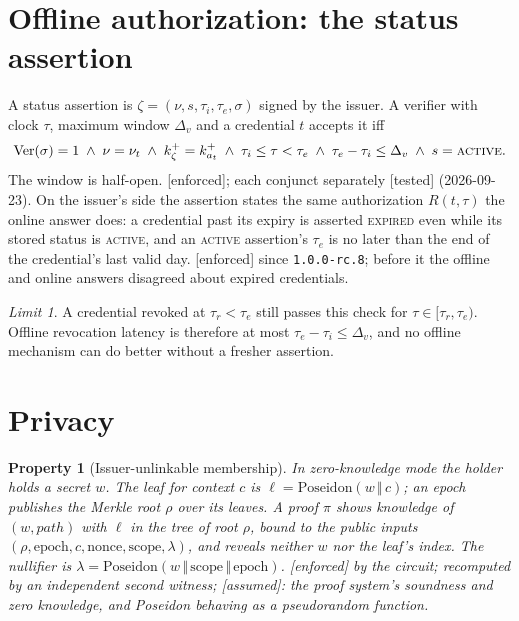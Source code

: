 \documentclass[11pt]{article}
\newtheorem{property}{Property}
\theoremstyle{remark}
\newtheorem*{limit}{Limit}
\newcommand{\code}[1]{\texttt{#1}}
\newcommand{\emark}[1]{\textup{\textsf{[#1]}}}
\newcommand{\st}[1]{\textup{\textsc{#1}}}
\begin{document}
\section{Offline authorization: the status assertion}

A status assertion is $\zeta=(\nu,s,\tau_i,\tau_e,\sigma)$ signed by the issuer. A verifier with
clock $\tau$, maximum window $\Delta_v$ and a credential $t$ accepts it iff
\[
\mathrm{Ver}(\sigma)=1 \;\wedge\; \nu=\nu_t \;\wedge\; k^+_\zeta=k^+_{a_t}
\;\wedge\; \tau_i\le\tau<\tau_e \;\wedge\; \tau_e-\tau_i\le\Delta_v \;\wedge\; s=\st{active}.
\]
The window is half-open. \emark{enforced}; each conjunct separately \emark{tested} (2026-09-23).
On the issuer's side the assertion states the same authorization $R(t,\tau)$ the online answer
does: a credential past its expiry is asserted \st{expired} even while its stored status is
\st{active}, and an \st{active} assertion's $\tau_e$ is no later than the end of the credential's
last valid day. \emark{enforced} since \code{1.0.0-rc.8}; before it the offline and online answers
disagreed about expired credentials.
\begin{limit}
A credential revoked at $\tau_r<\tau_e$ still passes this check for $\tau\in[\tau_r,\tau_e)$. Offline
revocation latency is therefore at most $\tau_e-\tau_i\le\Delta_v$, and no offline mechanism can do
better without a fresher assertion.
\end{limit}

\section{Privacy}

\begin{property}[Issuer-unlinkable membership] In zero-knowledge mode the holder holds a secret $w$.
The leaf for context $c$ is $\ell=\mathrm{Poseidon}(w\,\Vert\,c)$; an epoch publishes the Merkle root
$\rho$ over its leaves. A proof $\pi$ shows knowledge of $(w,\mathit{path})$ with $\ell$ in the tree
of root $\rho$, bound to the public inputs $(\rho,\text{epoch},c,\text{nonce},\text{scope},\lambda)$, and
reveals neither $w$ nor the leaf's index. The nullifier is
$\lambda=\mathrm{Poseidon}(w\,\Vert\,\text{scope}\,\Vert\,\text{epoch})$. \emark{enforced} by the
circuit; recomputed by an independent second witness; \emark{assumed}: the proof system's soundness and
zero knowledge, and Poseidon behaving as a pseudorandom function.
\end{property}
\end{document}
